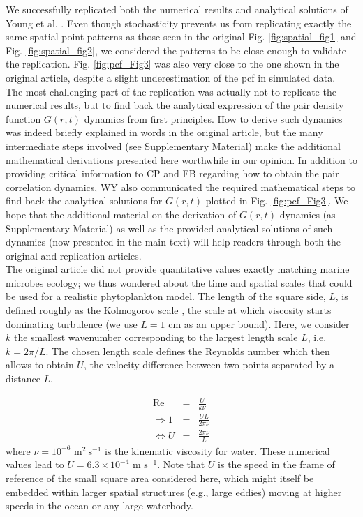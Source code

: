 We successfully replicated both the numerical results and analytical solutions of Young et al. \citep{young_reproductive_2001}. Even though stochasticity prevents us from replicating exactly the same spatial point patterns as those seen in the original Fig. \ref{fig:spatial_fig1} and Fig. \ref{fig:spatial_fig2}, we considered the patterns to be close enough to validate the replication. Fig. \ref{fig:pcf_Fig3} was also very close to the one shown in the original article, despite a slight underestimation of the pcf in simulated data.\\

The most challenging part of the replication was actually not to replicate the numerical results, but to find back the analytical expression of the pair density function $G(r,t)$ dynamics from first principles. How to derive such dynamics was indeed briefly explained in words in the original article, but the many intermediate steps involved (see Supplementary Material) make the additional mathematical derivations presented here worthwhile in our opinion. In addition to providing critical information to CP and FB regarding how to obtain the pair correlation dynamics, WY also communicated the required mathematical steps to find back the analytical solutions for $G(r,t)$ plotted in Fig. \ref{fig:pcf_Fig3}. We hope that the additional material on the derivation of $G(r,t)$ dynamics (as Supplementary Material) as well as the provided analytical solutions of such dynamics (now presented in the main text) will help readers through both the original and replication articles. \\

The original article did not provide quantitative values exactly matching marine microbes ecology; we thus wondered about the time and spatial scales that could be used for a realistic phytoplankton model. The length of the square side, $L$, is defined roughly as the Kolmogorov scale \citep{tennekes1972first}, the scale at which viscosity starts dominating turbulence  (we use $L= 1$ cm as an upper bound). Here, we consider $k$ the smallest wavenumber corresponding to the largest length scale $L$, i.e. $k=2\pi/L$. The chosen length scale defines the Reynolds number which then allows to obtain $U$, the velocity difference between two points separated by a distance $L$.  
 
\begin{eqnarray}
 \text{Re} & = &\frac{U}{k\nu}\\
\Rightarrow 1 & = & \frac{UL}{2\pi\nu}\\
\Leftrightarrow U & = &\frac{2\pi\nu}{L}
\end{eqnarray}
% 
where $\nu=10^{-6} \text{ m}^{2}~\text{s}^{-1}$ is the kinematic viscosity for water. These numerical values lead to $U=6.3\times10^{-4} \text{ m~s}^{-1}$. Note that $U$ is the speed in the frame of reference of the small square area considered here, which might itself be embedded within larger spatial structures (e.g., large eddies) moving at higher speeds in the ocean or any large waterbody.\\

